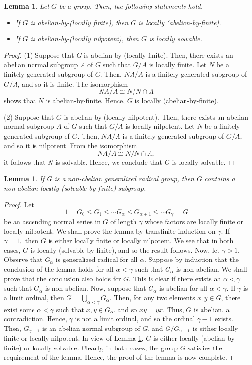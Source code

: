\documentclass{amsart}
\newtheorem{lemma}[theorem]{Lemma}
\theoremstyle{definition}
\begin{document}
\begin{lemma}\label{lem:2.1}
Let $G$ be a group. Then, the following statements hold:
\begin{itemize}
\item [(1)] If $G$ is abelian-by-(locally finite), then $G$ is locally (abelian-by-finite).
\item [(2)] If $G$ is abelian-by-(locally nilpotent), then $G$ is locally solvable.
\end{itemize}
\end{lemma}
\begin{proof}
(1) Suppose that $G$ is abelian-by-(locally finite). Then, there exists an abelian normal subgroup $A$ of $G$ such that $G/A$ is locally finite. Let $N$ be a finitely generated subgroup of $G$. Then, $NA/A$ is a finitely generated subgroup of $G/A$, and so it is finite. The isomorphism $$NA/A\cong N/N\cap A$$ shows that $N$ is abelian-by-finite. Hence, $G$ is locally (abelian-by-finite).
		
(2) Suppose that $G$ is abelian-by-(locally nilpotent). Then, there exists an abelian normal subgroup $A$ of $G$ such that $G/A$ is locally nilpotent. Let $N$ be a finitely generated subgroup of $G$. Then, $NA/A$ is a finitely generated subgroup of $G/A$, and so it is nilpotent. From the isomorphism $$NA/A\cong N/N\cap A,$$ it follows that $N$ is solvable. Hence, we conclude that $G$ is locally solvable.
\end{proof}
\begin{lemma}\label{lem:2.2} If $G$ is a non-abelian generalized radical group, then $G$ contains a non-abelian locally (solvable-by-finite) subgroup.
\end{lemma}
\begin{proof} Let 
	$$1=G_0\le G_1\le\cdots G_\alpha\le G_{\alpha+1}\le\cdots G_\gamma=G$$
be an ascending normal series in $G$ of length $\gamma$  whose factors are locally finite or locally nilpotent. We shall prove the lemma by transfinite induction on $\gamma.$ If $\gamma=1,$ then $G$ is either locally finite or locally nilpotent. We see that in both cases, $G$ is locally (solvable-by-finite), and so the result follows. Now, let $\gamma >1$. Observe that $G_\alpha$ is generalized radical for all $\alpha$. Suppose by induction that the conclusion of the lemma holds for all $\alpha<\gamma$ such that $G_\alpha$ is non-abelian. We shall prove that the conclusion also holds for $G$. This is clear if there exists an $\alpha<\gamma$ such that $G_\alpha$ is non-abelian. Now, suppose that $G_\alpha$ is abelian for all $\alpha<\gamma$.
If $\gamma$ is a limit ordinal, then $G=\bigcup_{\alpha<\gamma}G_\alpha$. Then, for any two elements $x,y\in G$, there exist some $\alpha<\gamma$ such that $x,y\in G_\alpha$, and so $xy=yx$. Thus, $G$ is abelian, a contradiction. Hence, $\gamma$ is not a limit ordinal, and so the ordinal $\gamma-1$ exists. Then, $G_{\gamma-1}$ is an abelian normal subgroup of $G$, and $G/G_{\gamma-1}$ is either locally finite or locally nilpotent. In view of Lemma \ref{lem:2.1},  $G$ is either locally (abelian-by-finite) or locally solvable. Clearly, in both cases, the group $G$ satisfies the requirement of the lemma. 
Hence, the proof of the lemma is now complete.
\end{proof}
\end{document}
